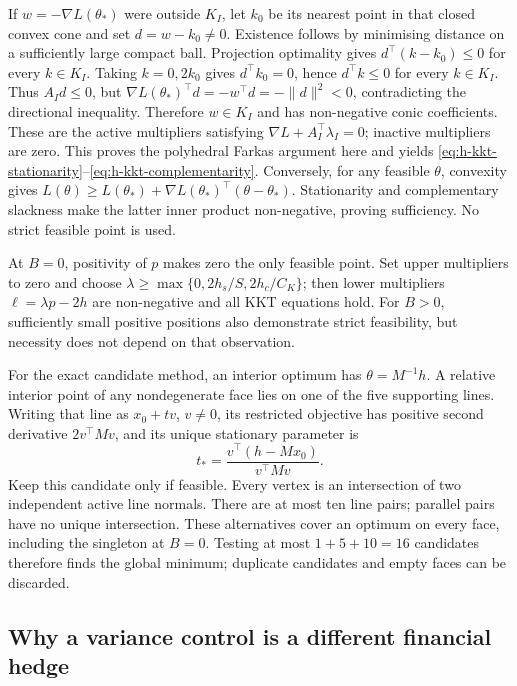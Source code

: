 \documentclass[11pt]{article}
\begin{document}
If $w=-\nabla L(\theta_*)$ were outside $K_I$, let $k_0$ be its
nearest point in that closed convex cone and set $d=w-k_0\ne0$.
Existence follows by minimising distance on a sufficiently large compact ball.
Projection optimality gives $d^\top(k-k_0)\leq0$ for every $k\in K_I$.
Taking $k=0,2k_0$ gives $d^\top k_0=0$, hence $d^\top k\leq0$
for every $k\in K_I$. Thus $A_Id\leq0$, but
$\nabla L(\theta_*)^\top d=-w^\top d=-\|d\|^2<0$,
contradicting the directional inequality. Therefore $w\in K_I$
and has non-negative conic coefficients. These are the active
multipliers satisfying $\nabla L+A_I^\top\lambda_I=0$; inactive
multipliers are zero. This proves the polyhedral Farkas argument here
and yields \eqref{eq:h-kkt-stationarity}--\eqref{eq:h-kkt-complementarity}.
Conversely, for any feasible $\theta$, convexity gives
$L(\theta)\geq L(\theta_*)+\nabla L(\theta_*)^\top(\theta-\theta_*)$.
Stationarity and complementary slackness make the latter inner product
non-negative, proving sufficiency. No strict feasible point is used.

At $B=0$, positivity of $p$ makes zero the only feasible point.
Set upper multipliers to zero and choose
$\lambda\geq\max\{0,2h_s/S,2h_c/C_K\}$; then lower multipliers
$\ell=\lambda p-2h$ are non-negative and all KKT equations hold.
For $B>0$, sufficiently small positive positions also demonstrate
strict feasibility, but necessity does not depend on that observation.

For the exact candidate method, an interior optimum has
$\theta=M^{-1}h$. A relative interior point of any nondegenerate face
lies on one of the five supporting lines. Writing that line as
$x_0+tv$, $v\ne0$, its restricted objective has positive second
derivative $2v^\top Mv$, and its unique stationary parameter is
\begin{equation}
 t_*=\frac{v^\top(h-Mx_0)}{v^\top Mv}.
 \label{eq:h-face-stationary}
\end{equation}
Keep this candidate only if feasible. Every vertex is an intersection
of two independent active line normals. There are at most ten line
pairs; parallel pairs have no unique intersection. These alternatives
cover an optimum on every face, including the singleton at $B=0$.
Testing at most $1+5+10=16$ candidates therefore finds the global
minimum; duplicate candidates and empty faces can be discarded.

\subsection{Why a variance control is a different financial hedge}
\end{document}
